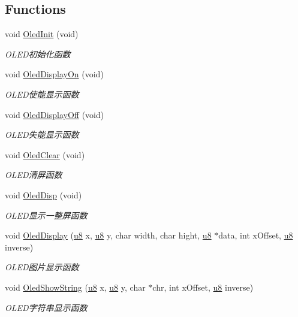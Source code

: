 \subsection*{\-Functions}
\begin{DoxyCompactItemize}
\item 
void \hyperlink{group___o_l_e_d_ga11720eb1002774b7a17f14b56ff44af8}{\-Oled\-Init} (void)
\begin{DoxyCompactList}\small\item\em \-O\-L\-E\-D初始化函数 \end{DoxyCompactList}\item 
void \hyperlink{group___o_l_e_d_gaa6948206248a6fc7672d9272afb31200}{\-Oled\-Display\-On} (void)
\begin{DoxyCompactList}\small\item\em \-O\-L\-E\-D使能显示函数 \end{DoxyCompactList}\item 
void \hyperlink{group___o_l_e_d_gaad39f47a4a67e81eb4682bc2dc77f7f0}{\-Oled\-Display\-Off} (void)
\begin{DoxyCompactList}\small\item\em \-O\-L\-E\-D失能显示函数 \end{DoxyCompactList}\item 
void \hyperlink{group___o_l_e_d_gac33652401561bede6a56b8ff6f9cc16f}{\-Oled\-Clear} (void)
\begin{DoxyCompactList}\small\item\em \-O\-L\-E\-D清屏函数 \end{DoxyCompactList}\item 
void \hyperlink{group___o_l_e_d_ga74eb47866c0626523716f372981e46f9}{\-Oled\-Disp} (void)
\begin{DoxyCompactList}\small\item\em \-O\-L\-E\-D显示一整屏函数 \end{DoxyCompactList}\item 
void \hyperlink{group___o_l_e_d_ga803969611b487ce2e64bb960be64ad26}{\-Oled\-Display} (\hyperlink{group___b_s_p_gaed742c436da53c1080638ce6ef7d13de}{u8} x, \hyperlink{group___b_s_p_gaed742c436da53c1080638ce6ef7d13de}{u8} y, char width, char hight, \hyperlink{group___b_s_p_gaed742c436da53c1080638ce6ef7d13de}{u8} $\ast$data, int x\-Offset, \hyperlink{group___b_s_p_gaed742c436da53c1080638ce6ef7d13de}{u8} inverse)
\begin{DoxyCompactList}\small\item\em \-O\-L\-E\-D图片显示函数 \end{DoxyCompactList}\item 
void \hyperlink{group___o_l_e_d_ga0e199e6945e270291c54aedda692d48c}{\-Oled\-Show\-String} (\hyperlink{group___b_s_p_gaed742c436da53c1080638ce6ef7d13de}{u8} x, \hyperlink{group___b_s_p_gaed742c436da53c1080638ce6ef7d13de}{u8} y, char $\ast$chr, int x\-Offset, \hyperlink{group___b_s_p_gaed742c436da53c1080638ce6ef7d13de}{u8} inverse)
\begin{DoxyCompactList}\small\item\em \-O\-L\-E\-D字符串显示函数 \end{DoxyCompactList}\end{DoxyCompactItemize}

